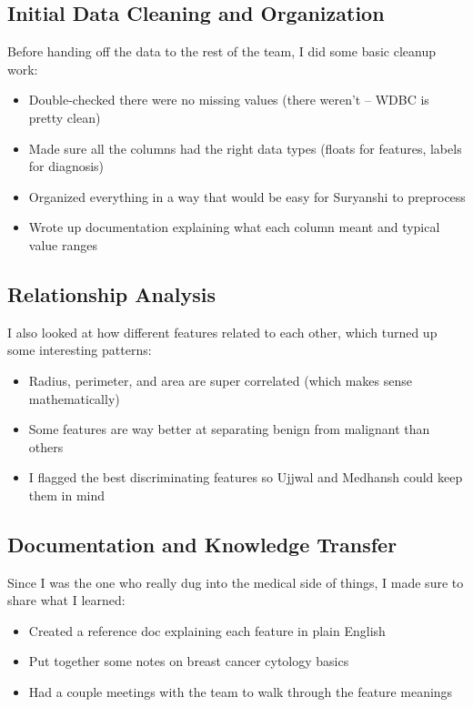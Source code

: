 \documentclass[12pt]{article}
\begin{document}
\subsection{Initial Data Cleaning and Organization}

Before handing off the data to the rest of the team, I did some basic cleanup work:
\begin{itemize}
    \item Double-checked there were no missing values (there weren't -- WDBC is pretty clean)
    \item Made sure all the columns had the right data types (floats for features, labels for diagnosis)
    \item Organized everything in a way that would be easy for Suryanshi to preprocess
    \item Wrote up documentation explaining what each column meant and typical value ranges
\end{itemize}

\subsection{Relationship Analysis}

I also looked at how different features related to each other, which turned up some interesting patterns:
\begin{itemize}
    \item Radius, perimeter, and area are super correlated (which makes sense mathematically)
    \item Some features are way better at separating benign from malignant than others
    \item I flagged the best discriminating features so Ujjwal and Medhansh could keep them in mind
\end{itemize}

\subsection{Documentation and Knowledge Transfer}

Since I was the one who really dug into the medical side of things, I made sure to share what I learned:
\begin{itemize}
    \item Created a reference doc explaining each feature in plain English
    \item Put together some notes on breast cancer cytology basics
    \item Had a couple meetings with the team to walk through the feature meanings
\end{itemize}
\end{document}

